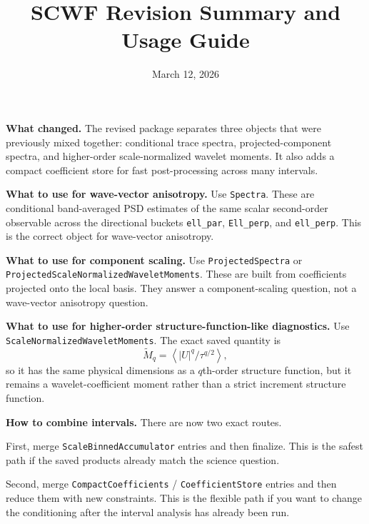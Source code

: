 \documentclass[10pt]{article}
\title{SCWF Revision Summary and Usage Guide}
\author{}
\date{March 12, 2026}
\begin{document}
\maketitle

\textbf{What changed.} The revised package separates three objects that were previously mixed together: conditional trace spectra, projected-component spectra, and higher-order scale-normalized wavelet moments. It also adds a compact coefficient store for fast post-processing across many intervals.

\textbf{What to use for wave-vector anisotropy.} Use \texttt{Spectra}. These are conditional band-averaged PSD estimates of the same scalar second-order observable across the directional buckets \texttt{ell\_par}, \texttt{Ell\_perp}, and \texttt{ell\_perp}. This is the correct object for wave-vector anisotropy.

\textbf{What to use for component scaling.} Use \texttt{ProjectedSpectra} or \texttt{ProjectedScaleNormalizedWaveletMoments}. These are built from coefficients projected onto the local basis. They answer a component-scaling question, not a wave-vector anisotropy question.

\textbf{What to use for higher-order structure-function-like diagnostics.} Use \texttt{ScaleNormalizedWaveletMoments}. The exact saved quantity is
\begin{equation}
\widetilde{M}_q = \left\langle |U|^q / \tau^{q/2} \right\rangle,
\end{equation}
so it has the same physical dimensions as a $q$th-order structure function, but it remains a wavelet-coefficient moment rather than a strict increment structure function.

\textbf{How to combine intervals.} There are now two exact routes.

First, merge \texttt{ScaleBinnedAccumulator} entries and then finalize. This is the safest path if the saved products already match the science question.

Second, merge \texttt{CompactCoefficients} / \texttt{CoefficientStore} entries and then reduce them with new constraints. This is the flexible path if you want to change the conditioning after the interval analysis has already been run.
\end{document}
